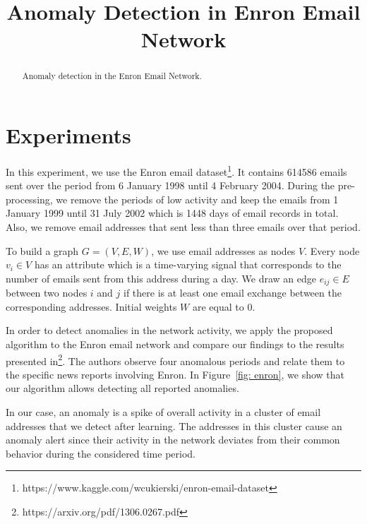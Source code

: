 \documentclass[]{article}
\title{Anomaly Detection in Enron Email Network}
\begin{document}
\maketitle

\begin{abstract}
Anomaly detection in the Enron Email Network.
\end{abstract}

\section{Experiments}
In this experiment, we use the Enron email dataset\footnote{https://www.kaggle.com/wcukierski/enron-email-dataset}. It contains 614586 emails sent over the period from 6 January 1998 until 4 February 2004. During the pre-processing, we remove the periods of low activity and keep the emails from 1 January 1999 until 31 July 2002 which is 1448 days of email records in total. Also, we remove email addresses that sent less than three emails over that period.

To build a graph \mbox{$G = (V,E,W)$}, we use email addresses as nodes $V$. Every node $v_i \in V$ has an attribute which is a time-varying signal that corresponds to the number of emails sent from this address during a day. We draw an edge $e_{ij} \in E$ between two nodes $i$ and $j$ if there is at least one email exchange between the corresponding addresses. Initial weights $W$ are equal to $0$.

In order to detect anomalies in the network activity, we apply the proposed algorithm to the Enron email network and compare our findings to the results presented in\footnote{https://arxiv.org/pdf/1306.0267.pdf}. The authors observe four anomalous periods and relate them to the specific news reports involving Enron. In Figure~\ref{fig: enron}, we show that our algorithm allows detecting all reported anomalies.

In our case, an anomaly is a spike of overall activity in a cluster of email addresses that we detect after learning. The addresses in this cluster cause an anomaly alert since their activity in the network deviates from their common behavior during the considered time period.
\end{document}
